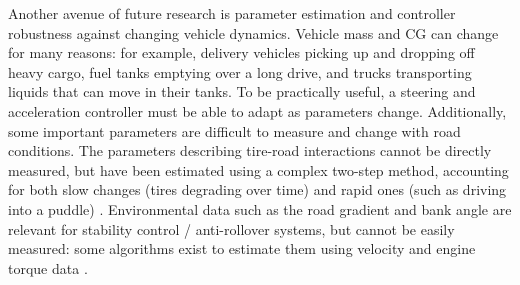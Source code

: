 \documentclass[conference]{IEEEtran}
\begin{document}
Another avenue of future research is parameter estimation and controller robustness against changing vehicle dynamics. Vehicle mass and CG can change for many reasons: for example, delivery vehicles picking up and dropping off heavy cargo, fuel tanks emptying over a long drive, and trucks transporting liquids that can move in their tanks. To be practically useful, a steering and acceleration controller must be able to adapt as parameters change.
Additionally, some important parameters are difficult to measure and change with road conditions. The parameters describing tire-road interactions cannot be directly measured, but have been estimated using a complex two-step method, accounting for both slow changes (tires degrading over time) and rapid ones (such as driving into a puddle) \cite{GARATTI20091304}. Environmental data such as the road gradient and bank angle are relevant for stability control / anti-rollover systems, but cannot be easily measured: some algorithms exist to estimate them using velocity and engine torque data \cite{mahyuddin2012}. 






\end{document}
